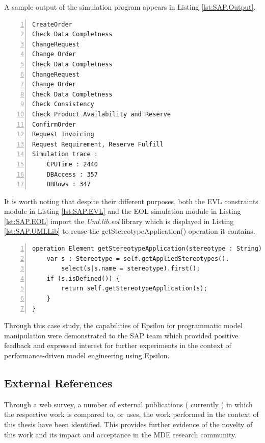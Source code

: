 A sample output of the simulation program appears in Listing \ref{lst:SAP.Output}.

\begin{lstlisting}[basicstyle=\ttfamily\footnotesize, flexiblecolumns=true, numbers=left, nolol=true, caption=Sample output of the simulation program of Listing \ref{lst:SAP.EOL}, label=lst:SAP.Output, tabsize=2]
CreateOrder
Check Data Completness
ChangeRequest
Change Order
Check Data Completness
ChangeRequest
Change Order
Check Data Completness
Check Consistency
Check Product Availability and Reserve
ConfirmOrder
Request Invoicing
Request Requirement, Reserve Fulfill
Simulation trace : 
	CPUTime : 2440
	DBAccess : 357
	DBRows : 347
\end{lstlisting}

It is worth noting that despite their different purposes, both the EVL constraints module in Listing \ref{lst:SAP.EVL} and the EOL simulation module in Listing \ref{lst:SAP.EOL} import the \emph{Uml.lib.eol} library which is displayed in Listing \ref{lst:SAP.UMLLib} to reuse the getStereotypeApplication() operation it contains.

\begin{lstlisting}[basicstyle=\ttfamily\footnotesize, flexiblecolumns=true, numbers=left, nolol=true, caption=The shared Uml.lib.eol library, label=lst:SAP.UMLLib, language=EOL, tabsize=2]
operation Element getStereotypeApplication(stereotype : String) {
	var s : Stereotype = self.getAppliedStereotypes().
		select(s|s.name = stereotype).first();
	if (s.isDefined()) {
		return self.getStereotypeApplication(s);
	}
}
\end{lstlisting}

Through this case study, the capabilities of Epsilon for programmatic model manipulation were demonstrated to the SAP team which provided positive feedback and expressed interest for further experiments in the context of performance-driven model engineering using Epsilon.

\subsection{External References}

Through a web survey, a number of external publications ( currently \cite{Zito2006,Langlois2006,Queralt2006,Boronat2006,Conmy2006,Karlsch2006,Eessaar2006,Costa2007,MinimalOCL,AlgebraicView,CrosscuttingMT,FeatureOriented,Weise2007,Pons08,Brauer2007,Rubin2008,VORA,Markovic2008,BrauerThesis,Reiter22007,Pons2007,Lazar2007,ReiterPetri2007,Zamani2007,Jeanneret2008}) in which the respective work is compared to, or uses, the work performed in the context of this thesis have been identified. This provides further evidence of the novelty of this work and its impact and acceptance in the MDE research community.

